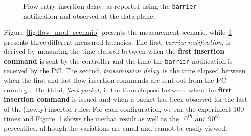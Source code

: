 \begin{figure}[ht]
  \begin{center}
  \end{center}
  \caption{Flow entry insertion delay: as reported using the
    \texttt{barrier} notification and observed at the data
    plane.}
  \label{fig:flow_insertion_comparison}
\end{figure}


Figure~\ref{fig:flow_mod_scenario} presents the measurement scenario,
while~\ref{fig:flow_insertion_comparison} presents three different measured
latencies.  The first, {\it barrier notification}, is derived by measuring the
time elapsed between when the \textbf{first insertion command} is sent by the \oflops
controller and the time the \texttt{barrier} notification is received by the
PC\@. The second, {\it transmission delay}, is the time elapsed between when the first and
last flow insertion commands are sent out from the PC running \oflops.  The
third, {\it first packet}, is the time elapsed between when the \textbf{first insertion
  command} is issued and when a packet has been observed for the last of the (newly)
inserted rules. For each configuration, we ran the experiment 100 times and
Figure~\ref{fig:flow_insertion_comparison} shows the median result as well as
the $10^{th}$ and $90^{th}$ percentiles, although the variations are small and
cannot be easily viewed.

